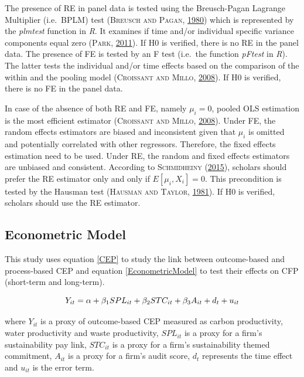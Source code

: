 \documentclass[12pt,]{article}
\begin{document}
The presence of RE in panel data is tested using the Breusch-Pagan
Lagrange Multiplier (i.e.~BPLM) test (\textsc{Breusch and Pagan},
\protect\hyperlink{ref-Breusch1980}{1980}) which is represented by the
\emph{plmtest} function in \emph{R}. It examines if time and/or
individual specific variance components equal zero (\textsc{Park},
\protect\hyperlink{ref-Park2011}{2011}). If H0 is verified, there is no
RE in the panel data. The presence of FE is tested by an F test
(i.e.~the function \emph{pFtest} in \emph{R}). The latter tests the
individual and/or time effects based on the comparison of the within and
the pooling model (\textsc{Croissant and Millo},
\protect\hyperlink{ref-Croissant2008}{2008}). If H0 is verified, there
is no FE in the panel data.

In case of the absence of both RE and FE, namely \(\mu_{i} = 0\), pooled
OLS estimation is the most efficient estimator (\textsc{Croissant and
Millo}, \protect\hyperlink{ref-Croissant2008}{2008}). Under FE, the
random effects estimators are biased and inconsistent given that
\(\mu_{i}\) is omitted and potentially correlated with other regressors.
Therefore, the fixed effects estimation need to be used. Under RE, the
random and fixed effects estimators are unbiased and consistent.
According to \textsc{Schmidheiny}
(\protect\hyperlink{ref-Schmidheiny2015}{2015}), scholars should prefer
the RE estimator only and only if \(E[\mu_{i}, X_{i}] = 0\). This
precondition is tested by the Hausman test (\textsc{Hausman and Taylor},
\protect\hyperlink{ref-Hausman1981}{1981}). If H0 is verified, scholars
should use the RE estimator.

\subsection{Econometric Model}\label{econometric-model}

This study uses equation \ref{CEP} to study the link between
outcome-based and process-based CEP and equation \ref{EconometricModel}
to test their effects on CFP (short-term and long-term).

\begin{equation}
\centering
Y_{it} = \alpha + \beta_{1} SPL_{it} + \beta_{2} STC_{it} + \beta_{3} A_{it} + d_{t} + u_{it}
\label{CEP}
\end{equation}

where \(Y_{it}\) is a proxy of outcome-based CEP measured as carbon
productivity, water productivity and waste productivity, \(SPL_{it}\) is
a proxy for a firm's sustainability pay link, \(STC_{it}\) is a proxy
for a firm's sustainability themed commitment, \(A_{it}\) is a proxy for
a firm's audit score, \(d_{t}\) represents the time effect and
\(u_{it}\) is the error term.
\end{document}
